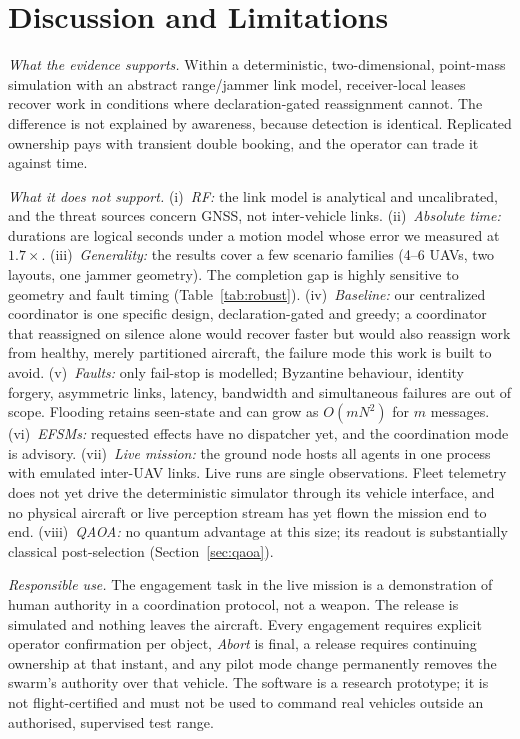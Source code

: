 \documentclass[conference]{IEEEtran}
\begin{document}
\section{Discussion and Limitations}
\label{sec:discussion}

\emph{What the evidence supports.} Within a deterministic, two-dimensional,
point-mass simulation with an abstract range/jammer link model,
receiver-local leases recover work in conditions where declaration-gated
reassignment cannot. The difference is not explained by awareness, because
detection is identical. Replicated ownership pays with transient double
booking, and the operator can trade it against time.

\emph{What it does not support.} (i)~\emph{RF:} the link model is analytical
and uncalibrated, and the threat sources concern GNSS, not inter-vehicle
links. (ii)~\emph{Absolute time:} durations are logical seconds under a
motion model whose error we measured at $1.7\times$. (iii)~\emph{Generality:}
the results cover a few scenario families (4--6 UAVs, two layouts, one
jammer geometry). The completion gap is highly sensitive to geometry and
fault timing (Table~\ref{tab:robust}). (iv)~\emph{Baseline:} our centralized
coordinator is one specific design, declaration-gated and greedy; a
coordinator that reassigned on silence alone would recover faster but would
also reassign work from healthy, merely partitioned aircraft, the failure
mode this work is built to avoid. (v)~\emph{Faults:} only fail-stop is modelled;
Byzantine behaviour, identity forgery, asymmetric links, latency, bandwidth
and simultaneous failures are out of scope. Flooding retains seen-state and
can grow as $O(mN^2)$ for $m$ messages. (vi)~\emph{EFSMs:} requested effects
have no dispatcher yet, and the coordination mode is advisory.
(vii)~\emph{Live mission:} the ground node hosts all agents in one process
with emulated inter-UAV links. Live runs are single observations. Fleet
telemetry does not yet drive the deterministic simulator through its vehicle
interface, and no physical aircraft or live perception stream has yet flown
the mission end to end. (viii)~\emph{QAOA:} no quantum advantage at this size;
its readout is substantially classical post-selection
(Section~\ref{sec:qaoa}).

\emph{Responsible use.} The engagement task in the live mission is a
demonstration of human authority in a coordination protocol, not a weapon. The
release is simulated and nothing leaves the aircraft. Every engagement
requires explicit operator confirmation per object, \emph{Abort} is final, a
release requires continuing ownership at that instant, and any pilot mode
change permanently removes the swarm's authority over that vehicle. The
software is a research prototype; it is not flight-certified and must not be
used to command real vehicles outside an authorised, supervised test range.
\end{document}
